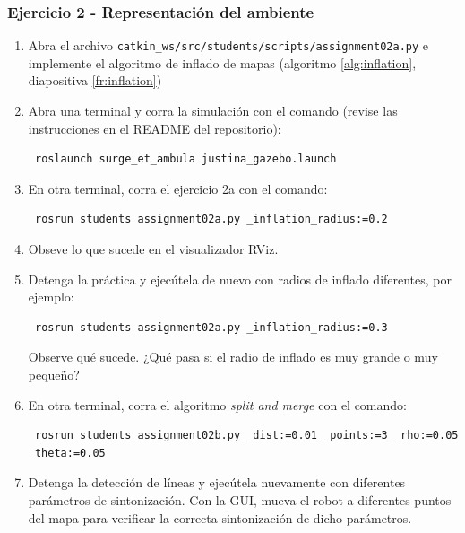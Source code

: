 \begin{frame}[containsverbatim]\frametitle{Ejercicio 2 - Representación del ambiente}
  \begin{enumerate}
  \item Abra el archivo \texttt{catkin\_ws/src/students/scripts/assignment02a.py} e implemente el algoritmo de inflado de mapas (algoritmo \ref{alg:inflation}, diapositiva \ref{fr:inflation})
  \item Abra una terminal y corra la simulación con el comando (revise las instrucciones en el README del repositorio):
\begin{verbatim}
 roslaunch surge_et_ambula justina_gazebo.launch
\end{verbatim}
  \item En otra terminal, corra el ejercicio 2a con el comando:
\begin{verbatim}
 rosrun students assignment02a.py _inflation_radius:=0.2
\end{verbatim}
  \item Obseve lo que sucede en el visualizador RViz.
  \item Detenga la práctica y ejecútela de nuevo con radios de inflado diferentes, por ejemplo:
\begin{verbatim}
 rosrun students assignment02a.py _inflation_radius:=0.3
\end{verbatim}
Observe qué sucede. ¿Qué pasa si el radio de inflado es muy grande o muy pequeño?
  \item En otra terminal, corra el algoritmo \textit{split and merge} con el comando:
\begin{verbatim}
 rosrun students assignment02b.py _dist:=0.01 _points:=3 _rho:=0.05 _theta:=0.05
\end{verbatim}
\item Detenga la detección de líneas y ejecútela nuevamente con diferentes parámetros de sintonización. Con la GUI, mueva el robot a diferentes puntos del mapa para verificar la correcta sintonización de dicho parámetros.
  \end{enumerate}
\end{frame}

